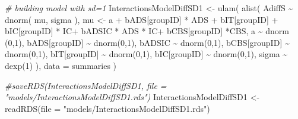\documentclass[
  10pt,
  dvipsnames, enabledeprecatedfontcommands]{scrartcl}
\newenvironment{Shaded}{\begin{snugshade}}{\end{snugshade}}
\newcommand{\AttributeTok}[1]{\textcolor[rgb]{0.77,0.63,0.00}{#1}}
\newcommand{\CommentTok}[1]{\textcolor[rgb]{0.56,0.35,0.01}{\textit{#1}}}
\newcommand{\DecValTok}[1]{\textcolor[rgb]{0.00,0.00,0.81}{#1}}
\newcommand{\FunctionTok}[1]{\textcolor[rgb]{0.00,0.00,0.00}{#1}}
\newcommand{\NormalTok}[1]{#1}
\newcommand{\OtherTok}[1]{\textcolor[rgb]{0.56,0.35,0.01}{#1}}
\newcommand{\SpecialCharTok}[1]{\textcolor[rgb]{0.00,0.00,0.00}{#1}}
\newcommand{\StringTok}[1]{\textcolor[rgb]{0.31,0.60,0.02}{#1}}
\begin{document}
\begin{Shaded}
\begin{Highlighting}[]
\CommentTok{\# building model with sd=1}
\NormalTok{InteractionsModelDiffSD1 }\OtherTok{\textless{}{-}} \FunctionTok{ulam}\NormalTok{(}
  \FunctionTok{alist}\NormalTok{(}
\NormalTok{    AdiffS }\SpecialCharTok{\textasciitilde{}} \FunctionTok{dnorm}\NormalTok{( mu, sigma ),}
\NormalTok{    mu }\OtherTok{\textless{}{-}}\NormalTok{ a }\SpecialCharTok{+}\NormalTok{ bADS[groupID] }\SpecialCharTok{*}\NormalTok{ ADS }\SpecialCharTok{+}\NormalTok{  bIT[groupID] }\SpecialCharTok{+}\NormalTok{ bIC[groupID] }\SpecialCharTok{*}\NormalTok{ IC}\SpecialCharTok{+}
\NormalTok{    bADSIC }\SpecialCharTok{*}\NormalTok{ ADS }\SpecialCharTok{*}\NormalTok{ IC}\SpecialCharTok{+}\NormalTok{ bCBS[groupID] }\SpecialCharTok{*}\NormalTok{CBS,}
\NormalTok{    a }\SpecialCharTok{\textasciitilde{}} \FunctionTok{dnorm}\NormalTok{ (}\DecValTok{0}\NormalTok{,}\DecValTok{1}\NormalTok{),}
\NormalTok{    bADS[groupID] }\SpecialCharTok{\textasciitilde{}} \FunctionTok{dnorm}\NormalTok{(}\DecValTok{0}\NormalTok{,}\DecValTok{1}\NormalTok{),}
\NormalTok{    bADSIC }\SpecialCharTok{\textasciitilde{}} \FunctionTok{dnorm}\NormalTok{(}\DecValTok{0}\NormalTok{,}\DecValTok{1}\NormalTok{),}
\NormalTok{    bCBS[groupID] }\SpecialCharTok{\textasciitilde{}} \FunctionTok{dnorm}\NormalTok{(}\DecValTok{0}\NormalTok{,}\DecValTok{1}\NormalTok{),}
\NormalTok{    bIT[groupID] }\SpecialCharTok{\textasciitilde{}} \FunctionTok{dnorm}\NormalTok{(}\DecValTok{0}\NormalTok{,}\DecValTok{1}\NormalTok{),}
\NormalTok{    bIC[groupID] }\SpecialCharTok{\textasciitilde{}} \FunctionTok{dnorm}\NormalTok{(}\DecValTok{0}\NormalTok{,}\DecValTok{1}\NormalTok{),}
\NormalTok{    sigma  }\SpecialCharTok{\textasciitilde{}} \FunctionTok{dexp}\NormalTok{(}\DecValTok{1}\NormalTok{)}
\NormalTok{  ),}
  \AttributeTok{data =}\NormalTok{ summaries}
\NormalTok{ )}
 
\CommentTok{\#saveRDS(InteractionsModelDiffSD1, file = "models/InteractionsModelDiffSD1.rds")}
\NormalTok{InteractionsModelDiffSD1 }\OtherTok{\textless{}{-}} \FunctionTok{readRDS}\NormalTok{(}\AttributeTok{file =} \StringTok{"models/InteractionsModelDiffSD1.rds"}\NormalTok{)}



\end{Highlighting}
\end{Shaded}
\end{document}
